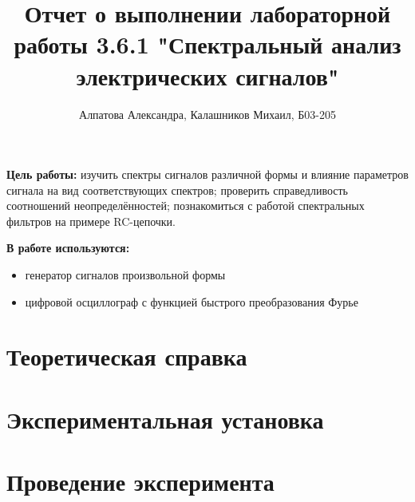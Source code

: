 \documentclass[14pt, a4paper]{report}
\title{\textbf{Отчет о выполнении лабораторной работы 3.6.1 "Спектральный анализ электрических сигналов"}}
\author{Алпатова Александра, Калашников Михаил, Б03-205}
\date{}
\begin{document}
\maketitle

\textbf{Цель работы:}
изучить спектры сигналов различной формы и влияние параметров сигнала на вид соответствующих спектров; проверить справедливость соотношений неопределённостей; познакомиться с работой спектральных фильтров на примере RC-цепочки.
\newline

\textbf{В работе используются:}
\begin{itemize}
\item генератор сигналов произвольной формы
\item цифровой осциллограф с функцией быстрого преобразования Фурье
\end{itemize}

\section{Теоретическая справка}


\section{Экспериментальная установка}


\section{Проведение эксперимента}
\end{document}
